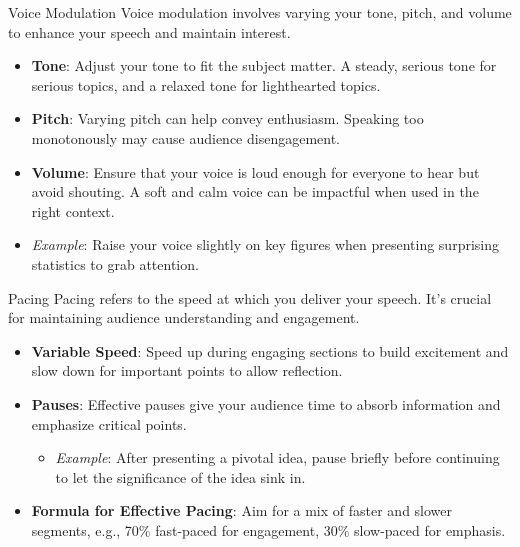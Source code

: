 \documentclass[aspectratio=169]{beamer}
\begin{document}
\begin{frame}[fragile]{Voice Modulation}
  Voice modulation involves varying your tone, pitch, and volume to enhance your speech and maintain interest.

  \begin{itemize}
    \item \textbf{Tone}: Adjust your tone to fit the subject matter. A steady, serious tone for serious topics, and a relaxed tone for lighthearted topics.
    
    \item \textbf{Pitch}: Varying pitch can help convey enthusiasm. Speaking too monotonously may cause audience disengagement.
    
    \item \textbf{Volume}: Ensure that your voice is loud enough for everyone to hear but avoid shouting. A soft and calm voice can be impactful when used in the right context.
    
    \item \textit{Example}: Raise your voice slightly on key figures when presenting surprising statistics to grab attention.
  \end{itemize}
\end{frame}

\begin{frame}[fragile]{Pacing}
  Pacing refers to the speed at which you deliver your speech. It's crucial for maintaining audience understanding and engagement.

  \begin{itemize}
    \item \textbf{Variable Speed}: Speed up during engaging sections to build excitement and slow down for important points to allow reflection.
    
    \item \textbf{Pauses}: Effective pauses give your audience time to absorb information and emphasize critical points.
    \begin{itemize}
      \item \textit{Example}: After presenting a pivotal idea, pause briefly before continuing to let the significance of the idea sink in.
    \end{itemize}
    
    \item \textbf{Formula for Effective Pacing}: Aim for a mix of faster and slower segments, e.g., 70\% fast-paced for engagement, 30\% slow-paced for emphasis.
  \end{itemize}
\end{frame}
\end{document}
